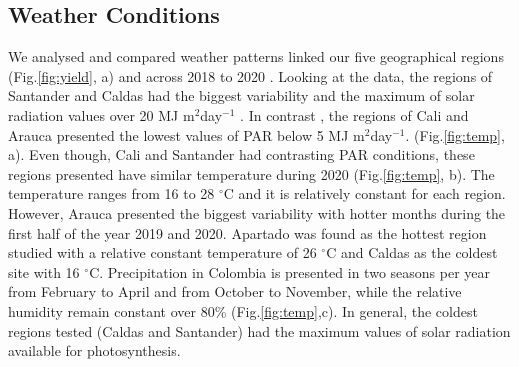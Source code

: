 \documentclass[gene,journal,article,submit,moreauthors,pdftex]{Definitions/mdpi}
\begin{document}
\subsection{Weather Conditions }
We analysed and compared weather patterns linked our five geographical regions (Fig.\ref{fig:yield}, a) and across 2018 to 2020 . Looking at the data, the regions of Santander and Caldas had the biggest variability and the maximum of solar radiation values over 20 MJ m$^{2}$day$^{-1}$ . In contrast , the regions of Cali and Arauca presented the lowest values of PAR below 5 MJ m$^{2}$day$^{-1}$. (Fig.\ref{fig:temp}, a).  Even though, Cali and Santander had contrasting PAR conditions, these regions presented  have similar temperature during 2020 (Fig.\ref{fig:temp}, b). The temperature ranges from 16 to 28 $^\circ$C and it is relatively constant for each region. However, Arauca presented the biggest variability with hotter months during the first half of the year 2019 and 2020.  Apartado was found as the hottest region studied with a relative constant temperature of 26 $^\circ$C and Caldas as the coldest site with 16 $^\circ$C.  Precipitation in Colombia is presented in two seasons per year from February to April and from October to November, while the relative humidity remain constant over 80\% (Fig.\ref{fig:temp},c). In general, the coldest regions tested (Caldas and Santander) had the maximum values of solar radiation available for photosynthesis. 
\end{document}
